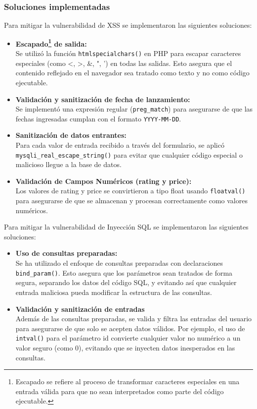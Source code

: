 \documentclass[a4paper,12pt]{article}
\newcommand{\code}[1]{\texttt{#1}}  %
\begin{document}
\vspace{1em}

\subsubsection{Soluciones implementadas}
Para mitigar la vulnerabilidad de XSS se implementaron las siguientes soluciones:

\begin{itemize}
	\item \textbf{Escapado\footnote{Escapado se refiere al proceso de transformar caracteres especiales en una entrada válida para que no sean interpretados como parte del código ejecutable.\cite{def_sanitization_escaping}} de salida:\\}
	Se utilizó la función \code{htmlspecialchars()} en PHP para escapar caracteres especiales (como <, >, \&, ", ') en todas las salidas. Esto asegura que el contenido reflejado en el navegador sea tratado como texto y no como código ejecutable.
	
	\item \textbf{Validación y sanitización de fecha de lanzamiento:\\} 
	Se implementó una expresión regular (\code{preg\_match}) para asegurarse de que las fechas ingresadas cumplan con el formato \code{YYYY-MM-DD}.
	
	\item \textbf{Sanitización de datos entrantes:\\} 
	Para cada valor de entrada recibido a través del formulario, se aplicó \\ \code{mysqli\_real\_escape\_string()} para evitar que cualquier código especial o malicioso llegue a la base de datos.
	
	\item \textbf{Validación de Campos Numéricos (rating y price):\\} 
	Los valores de rating y price se convirtieron a tipo float usando \code{floatval()} para asegurarse de que se almacenan y procesan correctamente como valores numéricos.
\end{itemize}
Para mitigar la vulnerabilidad de Inyección SQL se implementaron las siguientes soluciones:
\begin{itemize}
	\item \textbf{Uso de consultas preparadas:\\}
	Se ha utilizado el enfoque de consultas preparadas con declaraciones \code{bind\_param()}. Esto asegura que los parámetros sean tratados de forma segura, separando los datos del código SQL, y evitando así que cualquier entrada maliciosa pueda modificar la estructura de las consultas.
	\item \textbf{Validación y sanitización de entradas\\} Además de las consultas preparadas, se valida y filtra las entradas del usuario para asegurarse de que solo se acepten datos válidos. Por ejemplo, el uso de \code{intval()} para el parámetro id convierte cualquier valor no numérico a un valor seguro (como 0), evitando que se inyecten datos inesperados en las consultas.
\end{itemize}
\end{document}
